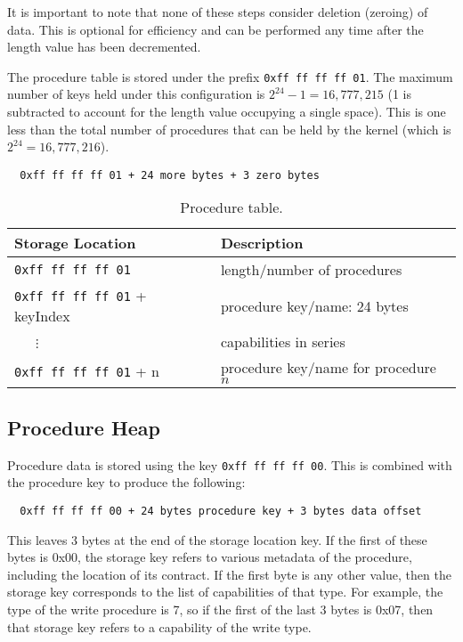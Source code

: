 \documentclass[english,a4paper]{article}
\begin{document}
It is important to note that none of these steps consider deletion (zeroing) of
data. This is optional for efficiency and can be performed any time after the
length value has been decremented.

The procedure table is stored under the prefix \texttt{0xff ff ff ff 01}. The
maximum number of keys held under this configuration is $2^{24} - 1 =
16,777,215$ (1 is subtracted to account for the length value occupying a single
space). This is one less than the total number of procedures that can be held by
the kernel (which is $2^{24} = 16,777,216$).

\begin{verbatim}
  0xff ff ff ff 01 + 24 more bytes + 3 zero bytes
\end{verbatim}

\begin{table}[H]
  \caption{Procedure table.}
  \centering{}%
  \begin{tabularx}{\textwidth}{l|X}
    \hline
    Storage Location & Description\\
    \hline
    \hline
    \texttt{0xff ff ff ff 01}     & length/number of procedures
      \\
    \texttt{0xff ff ff ff 01} + keyIndex & procedure key/name: 24 bytes
      \\
    ~~~$\vdots$ & capabilities in series \\
    \texttt{0xff ff ff ff 01} + n & procedure key/name for procedure $n$
      \\
    \hline
  \end{tabularx}
\end{table}

\subsection{Procedure Heap}\label{procedure-heap}

Procedure data is stored using the key \texttt{0xff ff ff ff 00}. This is
combined with the procedure key to produce the following:

\begin{verbatim}
  0xff ff ff ff 00 + 24 bytes procedure key + 3 bytes data offset
\end{verbatim}

This leaves 3 bytes at the end of the storage location key. If the first of
these bytes is 0x00, the storage key refers to various metadata of the
procedure, including the location of its contract. If the first byte is any
other value, then the storage key corresponds to the list of capabilities of
that type. For example, the type of the write procedure is 7, so if the first of
the last 3 bytes is 0x07, then that storage key refers to a capability of the
write type.
\end{document}
